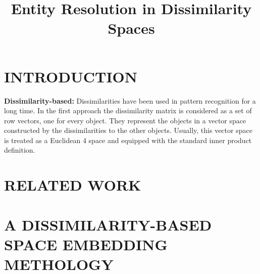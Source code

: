 \documentclass[
	12pt, %
]{fphw}
\title{ Entity Resolution in Dissimilarity Spaces} %
\institute{University of Athens \\ Department of Informatics and Telecommunications} %
\begin{document}
\maketitle %
\section{INTRODUCTION}

\textbf{Dissimilarity-based:} Dissimilarities have been used in pattern recognition for a long time. In the first approach the dissimilarity matrix is considered as a set of row vectors,
one for every object. They represent the objects in a vector space constructed by the
dissimilarities to the other objects. Usually, this vector space is treated as a Euclidean
4
space and equipped with the standard inner product definition.




\section{RELATED WORK}
\section{A DISSIMILARITY-BASED SPACE EMBEDDING METHOLOGY }
\end{document}
